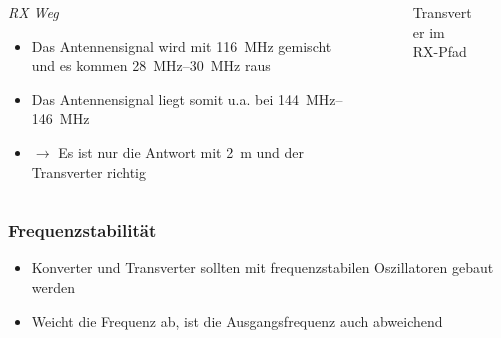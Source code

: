\begin{frame}
\begin{columns}
    \begin{column}{0.48\textwidth}
    \emph{RX Weg}

\begin{itemize}
  \item Das Antennensignal wird mit \qty{116}{\mega\hertz} gemischt und es kommen \qtyrange{28}{30}{\mega\hertz} raus
  \item Das Antennensignal liegt somit u.a. bei \qtyrange{144}{146}{\mega\hertz}
  \item $\rightarrow$ Es ist nur die Antwort mit \qty{2}{\metre} und der Transverter richtig
  \end{itemize}

    \end{column}
   \begin{column}{0.48\textwidth}
       
\begin{figure}
    \caption{\scriptsize Transverter im RX-Pfad}
    \label{e_transverter_rx}
\end{figure}


   \end{column}
\end{columns}

\end{frame}

\begin{frame}
\frametitle{Frequenzstabilität}
\begin{itemize}
  \item Konverter und Transverter sollten mit frequenzstabilen Oszillatoren gebaut werden
  \item Weicht die Frequenz ab, ist die Ausgangsfrequenz auch abweichend
  \end{itemize}
\end{frame}

